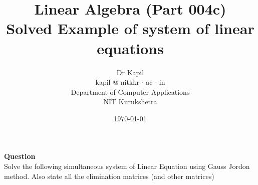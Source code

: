\documentclass[11pt,a4paper]{article}
\begin{document}
\title{Linear Algebra (Part 004c)\\Solved Example of system of linear equations}
\author{Dr Kapil\\kapil $@$ nitkkr $\cdot$ ac $\cdot$ in\\Department of Computer Applications\\ NIT Kurukshetra}
\date{\today}
\maketitle
\thispagestyle{fancy}   

\textbf{Question}\\ 
Solve the following simultaneous system of Linear Equation using Gauss Jordon method. Also state all the elimination matrices (and other matrices)\\
\end{document}
